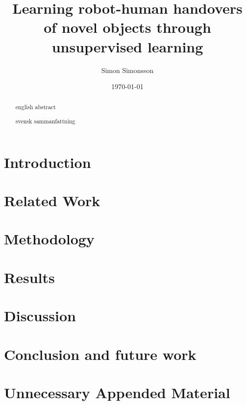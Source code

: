 \documentclass{kththesis}
\title{Learning robot-human handovers of novel objects through unsupervised learning}
\author{Simon Simonsson}
\date{\today}
\begin{document}
\frontmatter

\titlepage

\begin{abstract}
	english abstract
\end{abstract}


\begin{otherlanguage}{swedish}
  \begin{abstract}
	  svensk sammanfattning
  \end{abstract}
\end{otherlanguage}


\tableofcontents


\mainmatter


\chapter{Introduction}



\chapter{Related Work}



\chapter{Methodology}



\chapter{Results}


\chapter{Discussion}


\chapter{Conclusion and future work}


\printbibliography[heading=bibintoc] %

\appendix

\chapter{Unnecessary Appended Material}
\end{document}
